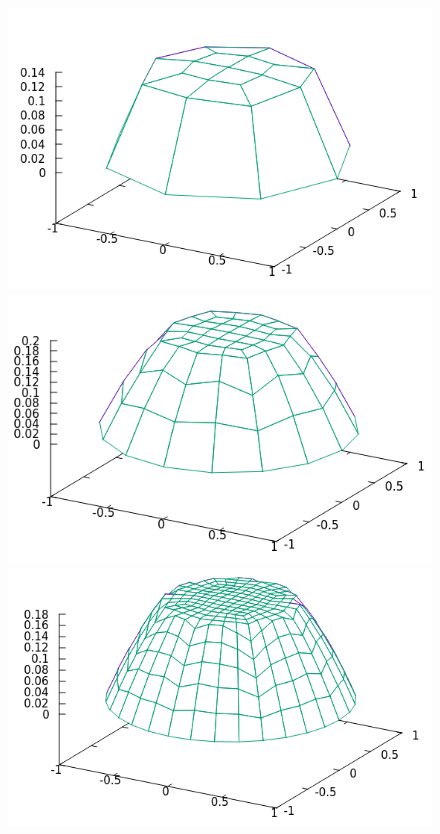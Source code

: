 \documentclass[11pt,fullpage]{article}
\theoremstyle{lemma}
\theoremstyle{definition}
\theoremstyle{lemma}
\begin{document}
\begin{figure}[!ht]
	\begin{minipage}{.45\paperwidth}
		\centering
		\includegraphics[scale=.5]{Step5-1.png}
	\end{minipage}%
	\begin{minipage}{.4\paperwidth}
		\centering
		\includegraphics[scale=.5]{Step5-2.png}
	\end{minipage}
	\begin{minipage}{.45\paperwidth}
		\centering
		\includegraphics[scale=.5]{Step5-3.png}

\end{minipage}
\end{figure}
\end{document}
